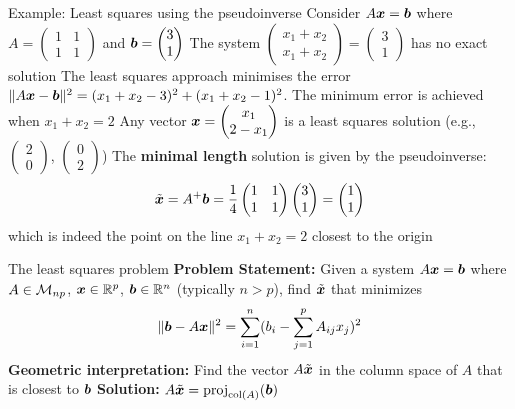 \documentclass[aspectratio=169]{beamer}\usepackage[]{graphicx}\usepackage[]{xcolor}
\begin{document}
\begin{frame}{Example: Least squares using the pseudoinverse}
Consider $A\bm{x} = \bm{b}$ where $A = \begin{pmatrix} 1 & 1 \\ 1 & 1 \end{pmatrix}$ and $\bm{b} = \begin{pmatrix} 3 \\ 1 \end{pmatrix}$
\vfill
The system $\begin{pmatrix} x_1+x_2 \\ x_1+x_2 \end{pmatrix} = \begin{pmatrix} 3 \\ 1 \end{pmatrix}$ has no exact solution
\vfill
The least squares approach minimises the error $\|A\bm{x}-\bm{b}\|^2 = (x_1+x_2-3)^2 + (x_1+x_2-1)^2$. The minimum error is achieved when $x_1+x_2 = 2$
\vfill
Any vector $\bm{x} = \begin{pmatrix} x_1 \\ 2-x_1 \end{pmatrix}$ is a least squares solution (e.g., $\begin{pmatrix} 2 \\ 0 \end{pmatrix}$, $\begin{pmatrix} 0 \\ 2 \end{pmatrix}$)
\vfill
The \textbf{minimal length} solution is given by the pseudoinverse:
\[
\tilde{\bm{x}} = A^+\bm{b} = \frac{1}{4}\begin{pmatrix} 1 & 1 \\ 1 & 1 \end{pmatrix}\begin{pmatrix} 3 \\ 1 \end{pmatrix} = \begin{pmatrix} 1 \\ 1 \end{pmatrix}
\]
which is indeed the point on the line $x_1+x_2=2$ closest to the origin
\end{frame}





\begin{frame}{The least squares problem}
\textbf{Problem Statement:}
\vfill
Given a system $A\bm{x} = \bm{b}$ where $A\in\mathcal{M}_{np}$, $\bm{x}\in\mathbb{R}^p$, $\bm{b}\in\mathbb{R}^n$ (typically $n>p$), find $\tilde{\bm{x}}$ that minimizes
$$
\|\bm{b} - A\bm{x}\|^2 = \sum_{i=1}^n (b_i - \sum_{j=1}^p A_{ij}x_j)^2
$$
\vfill
\textbf{Geometric interpretation:}
Find the vector $A\tilde{\bm{x}}$ in the column space of $A$ that is closest to $\bm{b}$
\vfill
\textbf{Solution:} $A\tilde{\bm{x}} = \text{proj}_{\text{col}(A)}(\bm{b})$
\end{frame}
\end{document}
